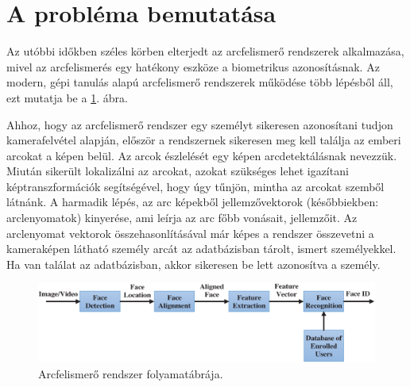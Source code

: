 
\section{A probléma bemutatása}
\label{sec:problem}





Az utóbbi időkben széles körben elterjedt az arcfelismerő rendszerek alkalmazása, mivel az arcfelismerés egy hatékony eszköze a biometrikus azonosításnak. Az modern, gépi tanulás alapú arcfelismerő rendszerek működése több lépésből áll, ezt mutatja be a \ref{fig:fr}. ábra. 

Ahhoz, hogy az arcfelismerő rendszer egy személyt sikeresen azonosítani tudjon kamerafelvétel alapján, először a rendszernek sikeresen meg kell találja az emberi arcokat a képen belül. Az arcok észlelését egy képen arcdetektálásnak nevezzük. Miután sikerült lokalizálni az arcokat, azokat szükséges lehet igazítani képtranszformációk segítségével, hogy úgy tűnjön, mintha az arcokat szemből látnánk. A harmadik lépés, az arc képekből jellemzővektorok (későbbiekben: arclenyomatok) kinyerése, ami leírja az arc főbb vonásait, jellemzőit. Az arclenyomat vektorok összehasonlításával már képes a rendszer összevetni a kameraképen látható személy arcát az adatbázisban tárolt, ismert személyekkel. Ha van találat az adatbázisban, akkor sikeresen be lett azonosítva a személy. \cite{hassan2021face}

\begin{figure}[h]
	\centering
	\includegraphics[width=1\columnwidth]{figures/facerecognition.png}
	\caption{Arcfelismerő rendszer folyamatábrája. \cite{hassan2021face}}
	\label{fig:fr}
\end{figure}

